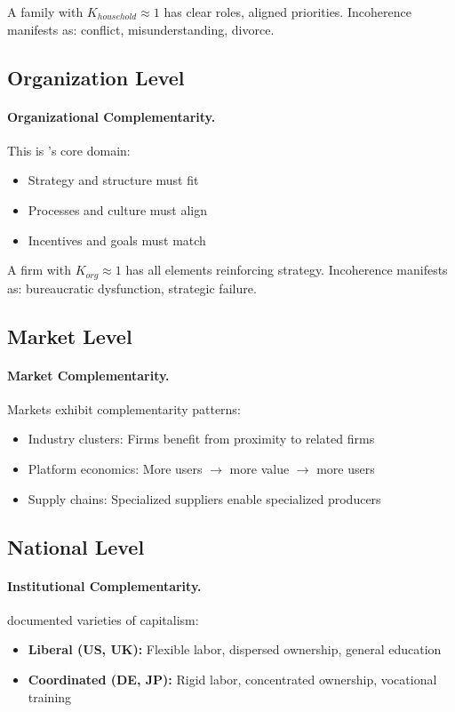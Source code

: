 A family with $K_{household} \approx 1$ has clear roles, aligned priorities.
Incoherence manifests as: conflict, misunderstanding, divorce.

\subsection{Organization Level}
\label{sec:comp-org}

\paragraph{Organizational Complementarity.}
This is \citet{milgromroberts1990modern}'s core domain:
\begin{itemize}[nosep]
  \item Strategy and structure must fit
  \item Processes and culture must align
  \item Incentives and goals must match
\end{itemize}

A firm with $K_{org} \approx 1$ has all elements reinforcing strategy.
Incoherence manifests as: bureaucratic dysfunction, strategic failure.

\subsection{Market Level}
\label{sec:comp-market}

\paragraph{Market Complementarity.}
Markets exhibit complementarity patterns:
\begin{itemize}[nosep]
  \item Industry clusters: Firms benefit from proximity to related firms
  \item Platform economics: More users $\to$ more value $\to$ more users
  \item Supply chains: Specialized suppliers enable specialized producers
\end{itemize}

\subsection{National Level}
\label{sec:comp-national}

\paragraph{Institutional Complementarity.}
\citet{hallsoskice2001} documented varieties of capitalism:
\begin{itemize}[nosep]
  \item \textbf{Liberal (US, UK):} Flexible labor, dispersed ownership, general education
  \item \textbf{Coordinated (DE, JP):} Rigid labor, concentrated ownership, vocational training
\end{itemize}

